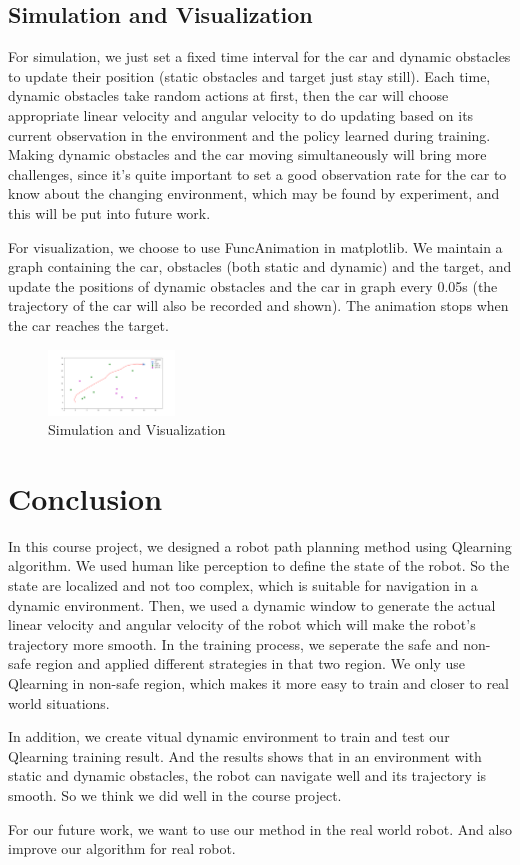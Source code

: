 \documentclass{acmtog} %
\begin{document}
\subsection{Simulation and Visualization}
For simulation, we just set a fixed time interval for the car and dynamic obstacles to update their position (static obstacles and target just stay still). Each time, dynamic obstacles take random actions at first, then the car will choose appropriate linear velocity and angular velocity to do updating based on its current observation in the environment and the policy learned during training. Making dynamic obstacles and the car moving simultaneously will bring more challenges, since it’s quite important to set a good observation rate for the car to know about the changing environment, which may be found by experiment, and this will be put into future work.

For visualization, we choose to use FuncAnimation in matplotlib. We maintain a graph containing the car, obstacles (both static and dynamic) and the target, and update the positions of dynamic obstacles and the car in graph every 0.05s (the trajectory of the car will also be recorded and shown). The animation stops when the car reaches the target.

\begin{figure}[H]
	\centering
	\includegraphics[width=0.3\textwidth]{fig2.PNG}
	\caption{Simulation and Visualization}
\end{figure}

\section{Conclusion}
In this course project, we designed a robot path planning method using Qlearning algorithm. We used human like perception to define the state of the robot. So the state are localized and not too complex, which is suitable for navigation in a dynamic environment. Then, we used a dynamic window to generate the actual linear velocity and angular velocity of the robot which will make the robot's trajectory more smooth. In the training process, we seperate the safe and non-safe region and applied different strategies in that two region. We only use Qlearning in non-safe region, which makes it more easy to train and closer to real world situations.

In addition, we create vitual dynamic environment to train and test our Qlearning training result. And the results shows that in an environment with static and dynamic obstacles, the robot can navigate well and its trajectory is smooth. So we think we did well in the course project.

For our future work, we want to use our method in the real world robot. And also improve our algorithm for real robot.
\appendix


\end{document}
